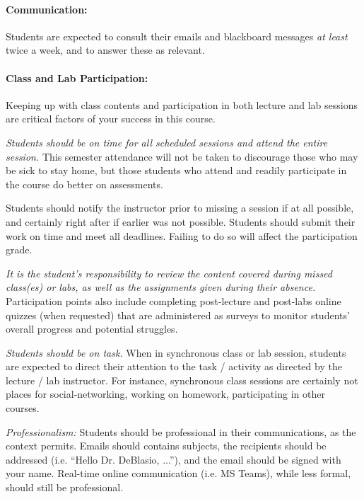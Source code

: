 \documentclass[12pt]{scrartcl}
\begin{document}
\paragraph{Communication:} Students are expected to consult their emails and blackboard messages \textit{at least} twice a week, and to answer these as relevant. 

\paragraph{Class and Lab Participation:} Keeping up with class contents and participation in both lecture and lab sessions are critical factors of your success in this course. 

\textit{Students should be on time for all scheduled sessions and attend the entire session.} 
This semester attendance will not be taken to discourage those who may be sick to stay home, 
but those students who attend and readily participate in the course do better on assessments.

Students should notify the instructor prior to missing a session if at all possible, and certainly right after if earlier was not possible. 
Students should submit their work on time and meet all deadlines. Failing to do so will affect the participation grade.


\textit{It is the student's responsibility to review the content covered during missed class(es) or labs, as well as the assignments given during their absence.}
Participation points also include completing post-lecture and post-labs online quizzes (when requested) that are administered as surveys to monitor students’ overall progress and potential struggles.

\textit{Students should be on task.} 
When in synchronous class or lab session, students are expected to direct their attention to the task / activity as directed by the lecture / lab instructor. 
For instance, synchronous class sessions are certainly not places for social-networking, working on homework, participating in other courses.

\textit{Professionalism:} 
Students should be professional in their communications, as the context permits.
Emails should contains subjects, the recipients should be addressed (i.e. ``Hello Dr. DeBlasio, ...''), and the email should be signed with your name. 
Real-time online communication (i.e. MS Teams), while less formal, should still be professional. 
\end{document}
